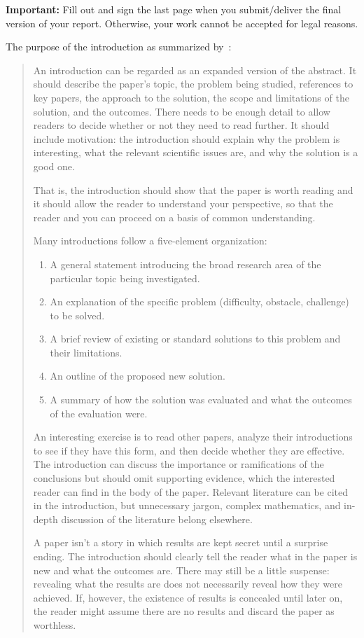 \documentclass[a4paper,oneside,bibliography=totoc]{scrartcl}
\begin{document}
\textbf{Important:} Fill out and sign the last page when you submit/deliver the
final version of your report. Otherwise, your work cannot be accepted for legal
reasons.

The purpose of the introduction as summarized by~\citet{zobel2004}:

\blockcquote{zobel2004}{%
  An introduction can be regarded as an expanded version of the abstract. It
  should describe the paper's topic, the problem being studied, references to
  key papers, the approach to the solution, the scope and limitations of the
  solution, and the outcomes. There needs to be enough detail to allow readers
  to decide whether or not they need to read further. It should include
  motivation: the introduction should explain why the problem is interesting,
  what the relevant scientific issues are, and why the solution is a good one.

  That is, the introduction should show that the paper is worth reading and it
  should allow the reader to understand your perspective, so that the reader and
  you can proceed on a basis of common understanding.

  Many introductions follow a five-element organization:
  \begin{enumerate}
  \item A general statement introducing the broad research area of the
    particular topic being investigated.
  \item An explanation of the specific problem (difficulty, obstacle, challenge)
    to be solved.
  \item A brief review of existing or standard solutions to this problem and
    their limitations.
  \item An outline of the proposed new solution.
  \item A summary of how the solution was evaluated and what the outcomes of the
    evaluation were.
  \end{enumerate}

  An interesting exercise is to read other papers, analyze their introductions
  to see if they have this form, and then decide whether they are effective. The
  introduction can discuss the importance or ramifications of the conclusions
  but should omit supporting evidence, which the interested reader can find in
  the body of the paper. Relevant literature can be cited in the introduction,
  but unnecessary jargon, complex mathematics, and in-depth discussion of the
  literature belong elsewhere.

  A paper isn't a story in which results are kept secret until a surprise
  ending. The introduction should clearly tell the reader what in the paper is
  new and what the outcomes are. There may still be a little suspense: revealing
  what the results are does not necessarily reveal how they were achieved. If,
  however, the existence of results is concealed until later on, the reader
  might assume there are no results and discard the paper as worthless.}
\end{document}
